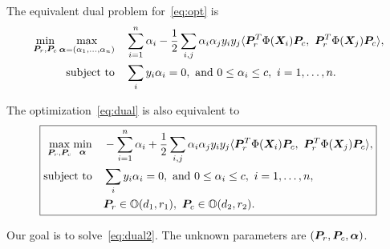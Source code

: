 \documentclass[11pt]{article}
\theoremstyle{plain}
\theoremstyle{definition}
\begin{document}
The equivalent dual problem for~\eqref{eq:opt} is
\begin{align}\label{eq:dual}
\min_{\bm{P}_r, \bm{P}_c} \max_{\boldsymbol{\alpha}=(\alpha_1,\ldots,\alpha_n)} &\quad  \sum_{i=1}^n \alpha_i- {1\over 2} \sum_{i,j}\alpha_i\alpha_jy_iy_j\langle 
\bm{P}^T_r\Phi(\bm X_i)\bm{P}_c,\ \bm{P}^T_r\Phi(\bm X_j)\bm{P}_c
\rangle, \notag\\
\text{subject to} &\quad \sum_i y_i\alpha_i=0, \text{ and }0\leq \alpha_i\leq c,\ i=1,\ldots,n.
\end{align}

The optimization~\eqref{eq:dual} is also equivalent to
\begin{equation}
\boxed{
\begin{aligned}\label{eq:dual2}
\max_{\bm{P}_r, \bm{P}_c} \min_{\boldsymbol{\alpha}} &\quad  -\sum_{i=1}^n \alpha_i +{1\over 2} \sum_{i,j}\alpha_i\alpha_jy_iy_j\langle 
\bm{P}^T_r\Phi(\bm X_i)\bm{P}_c,\ \bm{P}^T_r\Phi(\bm X_j)\bm{P}_c
\rangle,\\
\text{subject to} &\quad \sum_i y_i\alpha_i=0, \text{ and }0\leq \alpha_i\leq c,\ i=1,\ldots,n,\\
&\quad \bm{P}_r\in\mathbb{O}(d_1,r_1),\ \bm{P}_c\in\mathbb{O}(d_2,r_2).
\end{aligned}
}
\end{equation}

Our goal is to solve~\eqref{eq:dual2}. The unknown parameters are $(\bm{P}_r, \bm{P}_c, \boldsymbol{\alpha})$.
\end{document}
